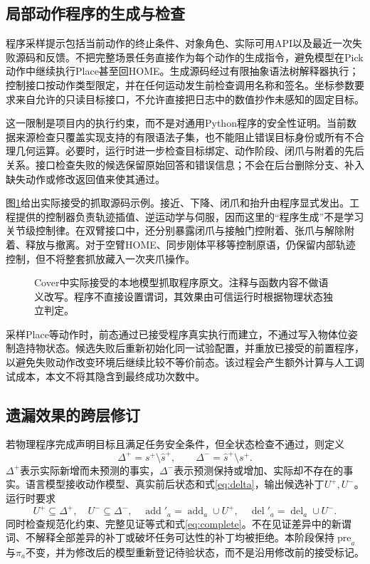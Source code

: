 \documentclass[UTF8,zihao=-4,fontset=fandol,a4paper]{ctexart}
\newcommand{\pre}{\operatorname{pre}}
\newcommand{\add}{\operatorname{add}}
\newcommand{\del}{\operatorname{del}}
\newcommand{\code}[1]{\texttt{\detokenize{#1}}}
\begin{document}
\subsection{局部动作程序的生成与检查}
程序采样提示包括当前动作的终止条件、对象角色、实际可用API以及最近一次失败源码和反馈。不把完整场景任务直接作为每个动作的生成指令，避免模型在Pick动作中继续执行Place甚至回HOME。生成源码经过有限抽象语法树解释器执行；控制接口按动作类型限定，并在任何运动发生前检查调用名称和签名。坐标参数要求来自允许的只读目标接口，不允许直接把日志中的数值抄作未感知的固定目标。

这一限制是项目内的执行约束，而不是对通用Python程序的安全性证明。当前数据来源检查只覆盖实现支持的有限语法子集，也不能阻止错误目标身份或所有不合理几何运算。必要时，运行时进一步检查目标绑定、动作阶段、闭爪与附着的先后关系。接口检查失败的候选保留原始回答和错误信息；不会在后台删除分支、补入缺失动作或修改返回值来使其通过。

图\ref{fig:code}给出实际接受的抓取源码示例。接近、下降、闭爪和抬升由程序显式发出。工程提供的控制器负责轨迹插值、逆运动学与伺服，因而这里的“程序生成”不是学习关节级控制律。在双臂接口中，还分别暴露闭爪与接触门控附着、张爪与解除附着、释放与撤离。对于空臂HOME、同步刚体平移等控制原语，仍保留内部轨迹控制，但不将整套抓放藏入一次夹爪操作。

\begin{figure}[htbp]

\caption{Cover中实际接受的本地模型抓取程序原文。注释与函数内容不做语义改写。程序不直接设置\code{holding}谓词，其效果由可信运行时根据物理状态独立判定。}
\label{fig:code}
\end{figure}

采样Place等动作时，前态通过已接受程序真实执行而建立，不通过写入物体位姿制造持物状态。候选失败后重新初始化同一试验配置，并重放已接受的前置程序，以避免失败动作改变环境后继续比较不等价前态。该过程会产生额外计算与人工调试成本，本文不将其隐含到最终成功次数中。

\subsection{遗漏效果的跨层修订}
若物理程序完成声明目标且满足任务安全条件，但全状态检查不通过，则定义
\begin{equation}
    \Delta^{+}=s^{+}\setminus\widehat{s}^{+},\qquad
    \Delta^{-}=\widehat{s}^{+}\setminus s^{+}.
    \label{eq:delta}
\end{equation}
$\Delta^{+}$表示实际新增而未预测的事实，$\Delta^{-}$表示预测保持或增加、实际却不存在的事实。语言模型接收动作模型、真实前后状态和式\eqref{eq:delta}，输出候选补丁$U^{+},U^{-}$。运行时要求
\begin{equation}
    U^{+}\subseteq\Delta^{+},\quad U^{-}\subseteq\Delta^{-},\quad
    \add'_a=\add_a\cup U^{+},\quad\del'_a=\del_a\cup U^{-}.
    \label{eq:patch}
\end{equation}
同时检查规范化约束、完整见证等式和式\eqref{eq:complete}。不在见证差异中的新谓词、不解释全部差异的补丁或破坏任务可达性的补丁均被拒绝。本阶段保持$\pre_a$与$\pi_a$不变，并为修改后的模型重新登记待验状态，而不是沿用修改前的接受标记。
\end{document}
